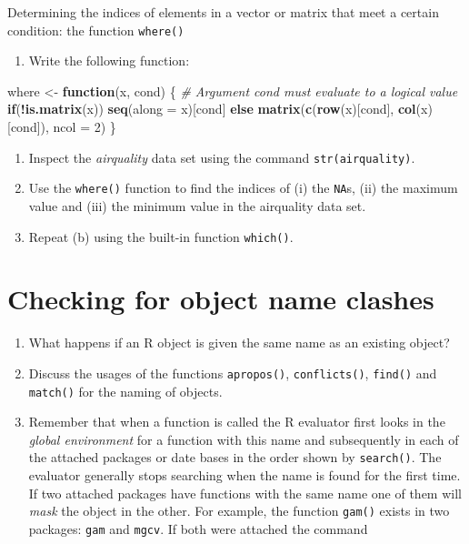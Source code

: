 \documentclass[
]{book}
\newenvironment{Shaded}{\begin{snugshade}}{\end{snugshade}}
\newcommand{\AttributeTok}[1]{\textcolor[rgb]{0.13,0.29,0.53}{#1}}
\newcommand{\CommentTok}[1]{\textcolor[rgb]{0.56,0.35,0.01}{\textit{#1}}}
\newcommand{\ControlFlowTok}[1]{\textcolor[rgb]{0.13,0.29,0.53}{\textbf{#1}}}
\newcommand{\DecValTok}[1]{\textcolor[rgb]{0.00,0.00,0.81}{#1}}
\newcommand{\FunctionTok}[1]{\textcolor[rgb]{0.13,0.29,0.53}{\textbf{#1}}}
\newcommand{\NormalTok}[1]{#1}
\newcommand{\OtherTok}[1]{\textcolor[rgb]{0.56,0.35,0.01}{#1}}
\newcommand{\SpecialCharTok}[1]{\textcolor[rgb]{0.81,0.36,0.00}{\textbf{#1}}}
\providecommand{\tightlist}{%
  \setlength{\itemsep}{0pt}\setlength{\parskip}{0pt}}
\begin{document}
Determining the indices of elements in a vector or matrix that meet a certain condition: the function \texttt{where()}

\begin{enumerate}
\def\labelenumi{(\alph{enumi})}
\tightlist
\item
  Write the following function:
\end{enumerate}

\begin{Shaded}
\begin{Highlighting}[]
\NormalTok{where }\OtherTok{\textless{}{-}} \ControlFlowTok{function}\NormalTok{(x, cond)}
\NormalTok{\{ }\CommentTok{\# Argument cond must evaluate to a logical value}
     \ControlFlowTok{if}\NormalTok{(}\SpecialCharTok{!}\FunctionTok{is.matrix}\NormalTok{(x))}
       \FunctionTok{seq}\NormalTok{(}\AttributeTok{along =}\NormalTok{ x)[cond]}
     \ControlFlowTok{else} \FunctionTok{matrix}\NormalTok{(}\FunctionTok{c}\NormalTok{(}\FunctionTok{row}\NormalTok{(x)[cond], }\FunctionTok{col}\NormalTok{(x)[cond]), }\AttributeTok{ncol =} \DecValTok{2}\NormalTok{)}
\NormalTok{\}}
\end{Highlighting}
\end{Shaded}

\begin{enumerate}
\def\labelenumi{(\alph{enumi})}
\setcounter{enumi}{1}
\item
  Inspect the \emph{airquality} data set using the command \texttt{str(airquality)}.
\item
  Use the \texttt{where()} function to find the indices of (i) the \texttt{NA}s, (ii) the maximum value and (iii) the minimum value in the airquality data set.
\item
  Repeat (b) using the built-in function \texttt{which()}.
\end{enumerate}

\section{Checking for object name clashes}\label{checking-for-object-name-clashes}

\begin{enumerate}
\def\labelenumi{(\alph{enumi})}
\item
  What happens if an R object is given the same name as an existing object?
\item
  Discuss the usages of the functions \texttt{apropos()}, \texttt{conflicts()}, \texttt{find()} and \texttt{match()} for the naming of objects.
\item
  Remember that when a function is called the R evaluator first looks in the \emph{{global environment}} for a function with this name and subsequently in each of the attached packages or date bases in the order shown by \texttt{search()}. The evaluator generally stops searching when the name is found for the first time. If two attached packages have functions with the same name one of them will \emph{{mask}} the object in the other. For example, the function \texttt{gam()} exists in two packages: \texttt{gam} and \texttt{mgcv}. If both were attached the command
\end{enumerate}
\end{document}
